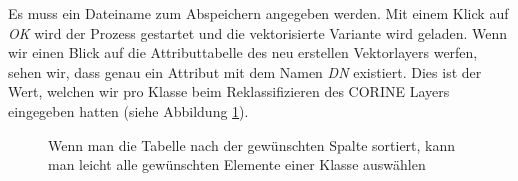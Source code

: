 \documentclass[a4paper,12pt,ngerman]{sphinxmanual}
\begin{document}
Es muss ein Dateiname zum Abspeichern angegeben werden. Mit einem Klick auf \emph{OK} wird der Prozess gestartet und die vektorisierte Variante wird geladen. Wenn wir einen Blick auf die Attributtabelle des neu erstellen Vektorlayers werfen, sehen wir, dass genau ein Attribut mit dem Namen \emph{DN} existiert. Dies ist der Wert, welchen wir pro Klasse beim Reklassifizieren des CORINE Layers eingegeben hatten (siehe Abbildung \hyperref[uebung4:figselectattr]{ \ref*{uebung4:figselectattr}}).
\begin{figure}[htbp]
\centering
\capstart

\caption{Wenn man die Tabelle nach der gewünschten Spalte sortiert, kann man leicht alle gewünschten Elemente einer Klasse auswählen}\label{uebung4:figselectattr}\end{figure}
\end{document}
